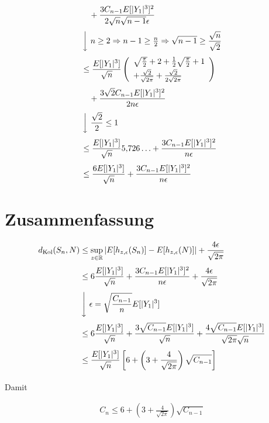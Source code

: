 \begin{align*}
&\quad + \frac{3C_{n-1}E[|Y_1|^3]^2}{2\sqrt{n}\sqrt{n-1}\epsilon} \nl
&\left\downarrow\ n \ge 2 \Rightarrow n-1 \ge \tfrac n2 \Rightarrow \sqrt{n-1} \ge \frac{\sqrt{n}}{\sqrt 2} \right. \nl
&\le \frac{E[|Y_1|^3]}{\sqrt n} \left(\begin{array}{l}\sqrt{\frac\pi2}+2+\frac 12 \sqrt{\frac \pi2}+1\nl +\frac{\sqrt{2}}{\sqrt{2\pi}} + \frac{\sqrt{2}}{2\sqrt{2\pi}}\end{array}\right) \nl
&\quad + \frac{3\sqrt{2}C_{n-1}E[|Y_1|^3]^2}{2n\epsilon}\nl
&\left\downarrow\ \frac{\sqrt 2}2 \le 1 \right. \nl
&\le \frac{E[|Y_1|^3]}{\sqrt n} 5{,}726\ldots + \frac{3 C_{n-1}E[|Y_1|^3]^2}{n\epsilon} \nl
&\le \frac{6E[|Y_1|^3]}{\sqrt n} + \frac{3 C_{n-1}E[|Y_1|^3]^2}{n\epsilon}
\end{align*}

\section{Zusammenfassung}

\begin{align*}
d_\text{Kol}(S_n,N) & \le \sup_{z\in\mathbb R}\left|E[h_{z,\epsilon}(S_n)]-E[h_{z,\epsilon}(N)]\right|+\frac{4\epsilon}{\sqrt{2\pi}} \nl
&\le 6\frac{E[|Y_1|^3]}{\sqrt n}+\frac{3C_{n-1}E[|Y_1|^3]^2}{n\epsilon}+\frac{4\epsilon}{\sqrt{2\pi}} \nl
&\left\downarrow\ \epsilon = \sqrt{\frac{C_{n-1}}{n}}E[|Y_1|^3] \right. \nl
&\le 6\frac{E[|Y_1|^3]}{\sqrt n}+\frac{3\sqrt{C_{n-1}}E[|Y_1|^3]}{\sqrt n}+\frac{4\sqrt{C_{n-1}}E[|Y_1|^3]}{\sqrt{2\pi}\sqrt{n}} \nl
&\le \frac{E[|Y_1|^3]}{\sqrt n}\left[6+\left(3+\frac{4}{\sqrt{2\pi}}\right)\sqrt{C_{n-1}}\right] \nl
\end{align*}

\noindent Damit

\begin{align*}
C_n \le 6 + \left(3 + \frac{4}{\sqrt{2\pi}}\right)\sqrt{C_{n-1}}
\end{align*}
